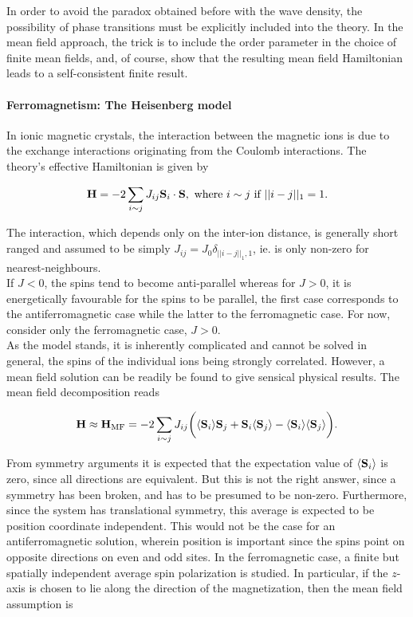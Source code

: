 \documentclass{homework}
\begin{document}
In order to avoid the paradox obtained before with the wave density, the possibility of phase transitions must be explicitly included into the theory. In the mean field approach, the trick is to include the order parameter in the choice of finite mean fields, and, of course, show that the resulting mean field Hamiltonian leads to a self-consistent finite result. \\

\paragraph{\textbf{Ferromagnetism: The Heisenberg model}}

In ionic magnetic crystals, the interaction between the magnetic ions is due to the exchange interactions originating from the Coulomb interactions. The theory's effective Hamiltonian is given by 

\begin{equation}
    {\bf H} = - 2 \sum_{i \sim j} J_{ij} {{\bf S}}_i \cdot {\bf S}, \textnormal{ where } i \sim j \textnormal{ if } ||i-j||_1 = 1.
\end{equation}

The interaction, which depends only on the inter-ion distance, is generally short ranged and assumed to be simply $J_{ij} = J_0 \delta_{||i-j||_1, 1}$, ie. is only non-zero for nearest-neighbours. \\

If $J<0$, the spins tend to become anti-parallel whereas for $J>0$, it is energetically favourable for the spins to be parallel, the first case corresponds to the antiferromagnetic case while the latter to the ferromagnetic case. For now, consider only the ferromagnetic case, $J > 0$. \\

As the model stands, it is inherently complicated and cannot be solved in general, the spins of the individual ions being strongly correlated. However, a mean field solution can be readily be found to give sensical physical results. The mean field decomposition reads

\begin{equation}
    {\bf H} \approx {\bf H}_{\textnormal{MF}} = -2 \sum_{i \sim j} J_{ij} \bigg( \langle {\bf S}_i \rangle {\bf S}_j + {\bf S}_i\langle {\bf S}_j \rangle - \langle {\bf S}_i \rangle \langle {\bf S}_j \rangle \bigg).
\end{equation}

From symmetry arguments it is expected that the expectation value of $\langle {\bf S}_i \rangle$ is zero, since all directions are equivalent. But this is not the right answer, since a symmetry has been broken, and has to be presumed to be non-zero. Furthermore, since the system has translational symmetry, this average is expected to be position coordinate independent. This would not be the case for an antiferromagnetic solution, wherein position is important since the spins point on opposite directions on even and odd sites. In the ferromagnetic case, a finite but spatially independent average spin polarization is studied. In particular, if the $z$-axis is chosen to lie along the direction of the magnetization, then the mean field assumption is
\end{document}
